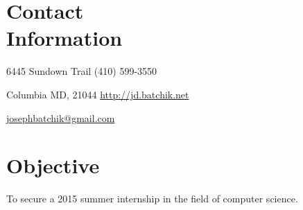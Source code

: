 \documentclass[a4paper,margin,line]{resume}
\begin{document}
\begin{resume}
\section{\mysidestyle Contact \\ Information} \vspace{2mm}
	\begin{asparablank}
    \item 6445 Sundown Trail  \hfill (410) 599-3550
		\item Columbia MD, 21044 \hfill \href{http://jd.batchik.net/}{http://jd.batchik.net}
		\item  \hfill \href{mailto:josephbatchik@gmail.com}{josephbatchik@gmail.com}
	\end{asparablank}

\section{\mysidestyle Objective}
	To secure a 2015 summer internship in the field of computer science.


\end{resume}
\end{document}
